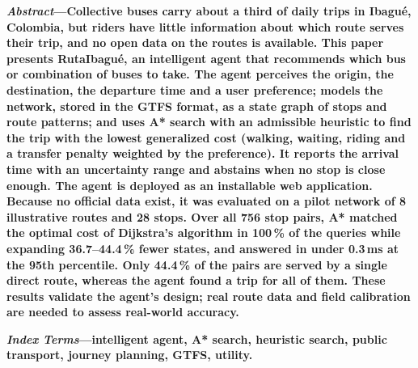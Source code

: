 \documentclass[10pt,twocolumn,letterpaper]{article}
\begin{document}

\noindent\textbf{\textit{Abstract}---Collective buses carry about a third of daily trips in Ibagué, Colombia, but riders have little information about which route serves their trip, and no open data on the routes is available. This paper presents RutaIbagué, an intelligent agent that recommends which bus or combination of buses to take. The agent perceives the origin, the destination, the departure time and a user preference; models the network, stored in the GTFS format, as a state graph of stops and route patterns; and uses A* search with an admissible heuristic to find the trip with the lowest generalized cost (walking, waiting, riding and a transfer penalty weighted by the preference). It reports the arrival time with an uncertainty range and abstains when no stop is close enough. The agent is deployed as an installable web application. Because no official data exist, it was evaluated on a pilot network of 8 illustrative routes and 28 stops. Over all 756 stop pairs, A* matched the optimal cost of Dijkstra's algorithm in 100\,\% of the queries while expanding 36.7--44.4\,\% fewer states, and answered in under 0.3\,ms at the 95th percentile. Only 44.4\,\% of the pairs are served by a single direct route, whereas the agent found a trip for all of them. These results validate the agent's design; real route data and field calibration are needed to assess real-world accuracy.}

\vspace{4pt}
\noindent\textbf{\textit{Index Terms}---intelligent agent, A* search, heuristic search, public transport, journey planning, GTFS, utility.}
\end{document}
